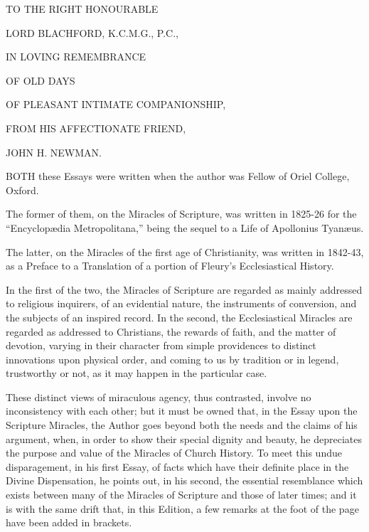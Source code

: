 



TO THE RIGHT HONOURABLE


LORD BLACHFORD, K.C.M.G., P.C.,


IN LOVING REMEMBRANCE


OF OLD DAYS


OF PLEASANT INTIMATE COMPANIONSHIP,


FROM HIS AFFECTIONATE FRIEND,



JOHN H. NEWMAN.








BOTH these Essays were written when the
author was Fellow of Oriel College, Oxford.


The former of them, on the Miracles of Scripture, was written in
1825-26 for the ``Encyclopædia Metropolitana,'' being the
sequel to a Life of Apollonius Tyanæus.


The latter, on the Miracles of the first age of Christianity, was
written in 1842-43, as a Preface to a Translation of a portion of
Fleury's Ecclesiastical History.


In the first of the two, the Miracles of Scripture are regarded as
mainly addressed to religious inquirers, of an evidential nature, the
instruments of conversion, and the subjects of an inspired record. In
the second, the Ecclesiastical Miracles are regarded as addressed to
Christians, the rewards of faith, and the matter of devotion, varying
in their character from simple providences to distinct innovations
upon physical order, and coming to us by tradition or in legend,
trustworthy or not, as it may happen in the particular case.

These distinct views of miraculous agency, thus contrasted, involve
no inconsistency with each other; but it must be owned that, in the
Essay upon the Scripture Miracles, the Author goes beyond both the
needs and the claims of his argument, when, in order to show their
special dignity and beauty, he depreciates the purpose and value of
the Miracles of Church History. To meet this undue disparagement, in
his first Essay, of facts which have their definite place in the
Divine Dispensation, he points out, in his second, the essential
resemblance which exists between many of the Miracles of Scripture and
those of later times; and it is with the same drift that, in this
Edition, a few remarks at the foot of the page have been added in
brackets.


